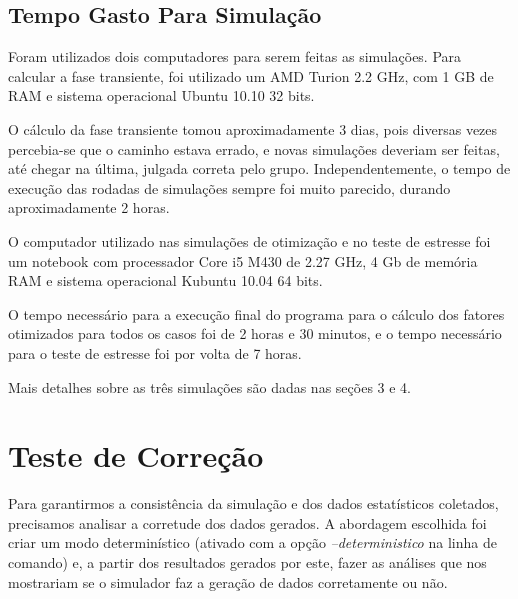 \documentclass[a4paper,10pt]{article}
\begin{document}
\subsection{Tempo Gasto Para Simulação}

    Foram utilizados dois computadores para serem feitas as simulações. Para calcular a fase transiente, foi utilizado um AMD Turion 2.2 GHz, com 1 GB de RAM
e sistema operacional Ubuntu 10.10 32 bits.

    O cálculo da fase transiente tomou aproximadamente 3 dias, pois diversas vezes percebia-se que o caminho estava errado, e  novas simulações deveriam ser
feitas, até chegar na última, julgada correta pelo grupo. Independentemente, o tempo de execução das rodadas de simulações sempre foi muito parecido, durando
aproximadamente 2 horas.

    O computador utilizado nas simulações de otimização e no teste de estresse foi um notebook com processador Core i5 M430 de 2.27 GHz, 4 Gb de memória RAM
e sistema operacional Kubuntu 10.04 64 bits.

    O tempo necessário para a execução final do programa para o cálculo dos fatores otimizados para todos os casos foi de 2 horas e 30 minutos, e o tempo necessário
para o teste de estresse foi por volta de 7 horas.

    Mais detalhes sobre as três simulações são dadas nas seções 3 e 4.

\pagebreak

\section{Teste de Correção}

    Para garantirmos a consistência da simulação e dos dados estatísticos coletados, precisamos analisar a corretude dos dados gerados. A abordagem escolhida foi criar um modo determinístico (ativado com a opção \emph{--deterministico} na linha de comando) e, a partir dos resultados gerados por este, fazer as análises que nos mostrariam se o simulador faz a geração de dados corretamente ou não.
\end{document}
